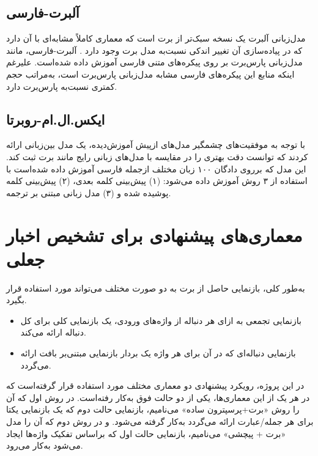 \subsection{آلبرت-فارسی}
	مدل‌زبانی آلبرت یک نسخه سبک‌تر از برت است که معماری کاملاً مشابه‌ای با آن دارد که در پیاده‌سازی آن تغییر اندکی نسبت‌به مدل برت وجود دارد \citep{ALBERTPersian}. آلبرت-فارسی، مانند مدل‌زبانی پارس‌برت بر روی  پیکره‌های متنی فارسی آموزش داده شده‌است. علیرغم اینکه منابع این پیکره‌های فارسی مشابه مدل‌زبانی پارس‌برت است، به‌مراتب حجم  کمتری نسبت‌به پارس‌برت دارد.
	
\subsection{ایکس.ال.ام-روبرتا}
	با توجه به موفقیت‌های چشمگیر مدل‌های ازپیش آموزش‌دیده، \cite{conneau2019unsupervised} یک مدل‌ بین‌زبانی ارائه کردند که توانست دقت بهتری را در مقایسه با مدل‌های زبانی رایج مانند برت ثبت کند. این مدل که برروی دادگان ۱۰۰ زبان مختلف ازجمله فارسی آموزش داده شده‌است  با استفاده از ۳ روش آموزش داده می‌شود: (۱) پیش‌بینی کلمه بعدی، (۲) پیش‌بینی کلمه پوشیده شده و (۳) مدل زبانی مبتنی بر ترجمه.

\section{معماری‌های پیشنهادی برای تشخیص اخبار جعلی}
به‌طور کلی، بازنمایی حاصل از برت به دو صورت مختلف می‌تواند مورد استفاده قرار بگیرد.
\begin{itemize}
\item بازنمایی تجمعی به ازای هر دنباله از واژه‌های ورودی، یک بازنمایی کلی برای کل دنباله ارائه می‌کند.
\item بازنمایی دنباله‌ای که در آن برای هر واژه یک بردار بازنمایی مبتنی‌بر بافت ارائه
 می‌گردد.
\end{itemize}

\noindent
در این پروژه، رویکرد پیشنهادی دو معماری مختلف مورد استفاده قرار گرفته‌است که در هر یک از این معماری‌ها، یکی از دو حالت فوق به‌کار رفته‌است.  در روش اول که آن را روش «برت+پرسپترون ساده» می‌نامیم، بازنمایی حالت دوم که یک بازنمایی یکتا برای هر جمله/عبارت ارائه می‌گردد به‌کار گرفته می‌شود. و در روش دوم که آن را مدل «برت + پیچشی» می‌نامیم، بازنمایی حالت اول که براساس تفکیک واژه‌ها ایجاد می‌شود به‌کار می‌رود.



